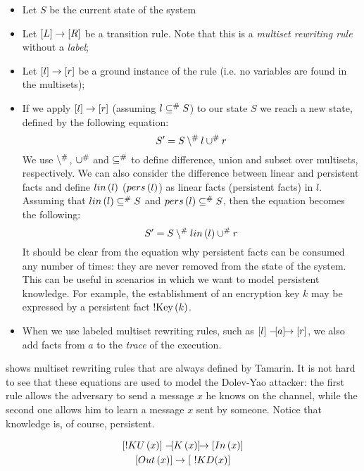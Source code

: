 \begin{itemize}
    \item{Let $S$ be the current state of the system}
    \item{Let $[L] \rightarrow [R]$ be a transition rule. Note that this is a \textit{multiset rewriting rule} without a \textit{label};}
    \item{Let $[l] \rightarrow [r]$ be a ground instance of the rule (i.e. no variables are found in the multisets);}
    \item{If we apply $[l] \rightarrow [r]$ (assuming $l \subseteq^\# S$) to our state $S$ we reach a new state, defined by the following equation:
                \begin{equation}
                    S' = S \setminus^\# l \cup^\# r
                \end{equation}
                We use $\setminus^\#$, $\cup^\#$ and $\subseteq^\#$ to define difference, union and subset over multisets, respectively. We can also consider the difference between linear and persistent facts and define $lin\left(l\right)$ ($pers\left(l\right)$) as linear facts (persistent facts) in $l$. Assuming that $lin\left(l\right) \subseteq^\# S$ and $pers\left(l\right) \subseteq^\# S$, then the equation becomes the following:
                \begin{equation}
                    S' = S \setminus^\# lin\left(l\right) \cup^\# r
                \end{equation}
                It should be clear from the equation why persistent facts can be consumed any number of times: they are never removed from the state of the system. This can be useful in scenarios in which we want to model persistent knowledge. For example, the establishment of an encryption key $k$ may be expressed by a persistent fact $\mbox{!Key}\left(k\right)$.
          }
    \item{When we use labeled multiset rewriting rules, such as $[l] \mathrel{-\hspace{-2pt}[a]\hspace{-4pt}\to} [r]$, we also add facts from $a$ to the \textit{trace} of the execution.}
\end{itemize}

 shows multiset rewriting rules that are always defined by Tamarin. It is not hard to see that these equations are used to model the Dolev-Yao attacker: the first rule allows the adversary to send a message $x$ he knows on the channel, while the second one allows him to learn a message $x$ sent by someone. Notice that knowledge is, of course, persistent.

\begin{equation}
    \label{eq:built-in-tamarin-msr-rules}
    \begin{gathered}
        \msr{!KU\left(x\right)}{K\left(x\right)}{In\left(x\right)}\\
        \msrnolabel{Out\left(x\right)}{\ !KD(x)}
    \end{gathered}
\end{equation}


